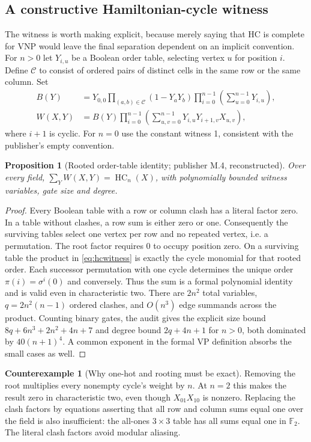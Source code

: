 \documentclass[11pt,letterpaper]{article}
\newtheorem{proposition}[theorem]{Proposition}
\theoremstyle{definition}\newtheorem{definition}[theorem]{Definition}\newtheorem{example}[theorem]{Example}
\newtheorem{counterexample}[theorem]{Counterexample}
\theoremstyle{remark}\newtheorem{remark}[theorem]{Remark}
\newcommand{\HC}{\operatorname{HC}}
\newcommand{\F}{\mathbb{F}}
\begin{document}
\subsection{A constructive Hamiltonian-cycle witness}\label{sec:hcwitness}
The witness is worth making explicit, because merely saying that HC is complete for VNP would leave the final separation dependent on an implicit convention. For $n>0$ let $Y_{i,u}$ be a Boolean order table, selecting vertex $u$ for position $i$. Define $\mathcal C$ to consist of ordered pairs of distinct cells in the same row or the same column. Set
\begin{align}
 B(Y)&=Y_{0,0}\prod_{(a,b)\in\mathcal C}(1-Y_aY_b)
              \prod_{i=0}^{n-1}\left(\sum_{u=0}^{n-1}Y_{i,u}\right),\\
 W(X,Y)&=B(Y)\prod_{i=0}^{n-1}\left(\sum_{u,v=0}^{n-1}
                 Y_{i,u}Y_{i+1,v}X_{u,v}\right),\label{eq:hcwitness}
\end{align}
where $i+1$ is cyclic. For $n=0$ use the constant witness 1, consistent with the publisher's empty convention.
\begin{proposition}[Rooted order-table identity; publisher M.4, reconstructed]\label{prop:hc}
Over every field, $\sum_Y W(X,Y)=\HC_n(X)$, with polynomially bounded witness variables, gate size and degree.
\end{proposition}
\begin{proof}
Every Boolean table with a row or column clash has a literal factor zero. In a table without clashes, a row sum is either zero or one. Consequently the surviving tables select one vertex per row and no repeated vertex, i.e. a permutation. The root factor requires $0$ to occupy position zero. On a surviving table the product in \eqref{eq:hcwitness} is exactly the cycle monomial for that rooted order. Each successor permutation with one cycle determines the unique order $\pi(i)=\sigma^i(0)$ and conversely. Thus the sum is a formal polynomial identity and is valid even in characteristic two. There are $2n^2$ total variables, $q=2n^2(n-1)$ ordered clashes, and $O(n^3)$ edge summands across the product. Counting binary gates, the audit gives the explicit size bound $8q+6n^3+2n^2+4n+7$ and degree bound $2q+4n+1$ for $n>0$, both dominated by $40(n+1)^4$. A common exponent in the formal VP definition absorbs the small cases as well.
\end{proof}
\begin{counterexample}[Why one-hot and rooting must be exact]
Removing the root multiplies every nonempty cycle's weight by $n$. At $n=2$ this makes the result zero in characteristic two, even though $X_{01}X_{10}$ is nonzero. Replacing the clash factors by equations asserting that all row and column sums equal one over the field is also insufficient: the all-ones $3\times3$ table has all sums equal one in $\F_2$. The literal clash factors avoid modular aliasing.
\end{counterexample}
\end{document}
